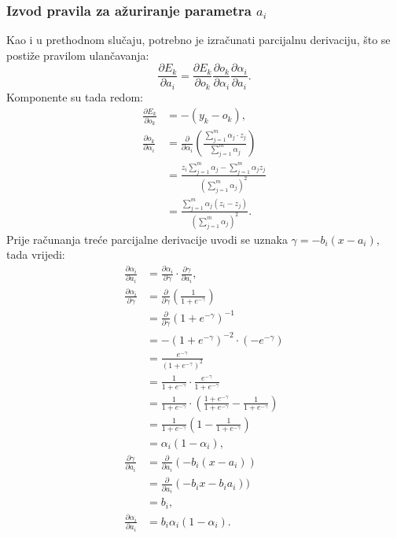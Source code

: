 \documentclass[12pt, a4paper, numeric]{article}
\begin{document}
\subsubsection{Izvod pravila za ažuriranje parametra $a_i$}
Kao i u prethodnom slučaju, potrebno je izračunati parcijalnu derivaciju, što se postiže pravilom ulančavanja:
\[
    \frac{\partial E_k}{\partial a_i} = \frac{\partial E_k}{\partial o_k} 
                                        \frac{\partial o_k}{\partial \alpha_i} 
                                        \frac{\partial \alpha_i}{\partial a_i}.
\]
Komponente su tada redom:
\begin{equation*}
    \begin{split}
        \frac{\partial E_k}{\partial o_k}
            &= -(y_k - o_k),\\
        \frac{\partial o_k}{\partial \alpha_i}
            &= \frac{\partial}{\partial \alpha_i} (\frac{\sum_{j=1}^{m}\alpha_j\cdot z_j}{\sum_{j=1}^{m}\alpha_j})\\
            &= \frac{z_i\sum_{j=1}^{m}\alpha_j - \sum_{j=1}^{m}\alpha_jz_j}{(\sum_{j=1}^{m}\alpha_j)^2}\\
            &= \frac{\sum_{j=1}^{m}\alpha_j(z_i-z_j)}{(\sum_{j=1}^{m}\alpha_j)^2}.
    \end{split}
\end{equation*}
Prije računanja treće parcijalne derivacije uvodi se uznaka $\gamma = -b_i(x-a_i)$, tada vrijedi:
\begin{equation*}
    \begin{split}
        \frac{\partial \alpha_i}{\partial a_i}
            &= \frac{\partial \alpha_i}{\partial \gamma} \cdot \frac{\partial \gamma}{\partial a_i},\\
        \frac{\partial \alpha_i}{\partial \gamma}
            &= \frac{\partial}{\partial \gamma} (\frac {1}{1 + e^{-\gamma}})\\
            &= \frac{\partial}{\partial \gamma} (1 + e^{-\gamma})^{-1}\\
            &= -(1 + e^{-\gamma})^{-2}\cdot (-e^{-\gamma})\\
            &= \frac{e^{-\gamma}}{(1+e^{-\gamma})^2}\\
            &= \frac{1}{1+e^{-\gamma}} \cdot \frac{e^{-\gamma}}{1+e^{-\gamma}}\\
            &= \frac{1}{1+e^{-\gamma}} \cdot (\frac{1+e^{-\gamma}}{1+e^{-\gamma}} - \frac{1}{1+e^{-\gamma}})\\
            &= \frac{1}{1+e^{-\gamma}} (1 - \frac{1}{1+e^{-\gamma}})\\
            &= \alpha_i (1 - \alpha_i),\\
        \frac{\partial \gamma}{\partial a_i}
            &= \frac{\partial}{\partial a_i}(-b_i(x-a_i))\\
            &= \frac{\partial}{\partial a_i}(-b_ix-b_ia_i))\\
            &= b_i,\\
        \frac{\partial \alpha_i}{\partial a_i}
            &= b_i\alpha_i (1 - \alpha_i).
    \end{split}
\end{equation*}
\end{document}
